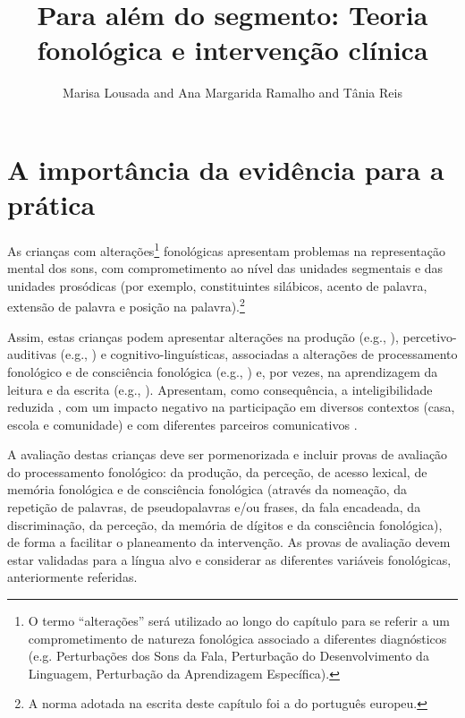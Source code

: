 \documentclass[output=paper,colorlinks,citecolor=brown,booklanguage=portuguese]{langscibook}
\title{Para além do segmento: Teoria fonológica e intervenção clínica}
\author{Marisa Lousada\affiliation{CINTESIS.UA, Escola Superior de Saúde, Universidade de Aveiro} and  Ana Margarida Ramalho\affiliation{Universidade de Lisboa, Faculdade de Letras, Centro de Linguística, Hospital do Espírito Santo - Évora (EPE)} and  Tânia Reis\affiliation{Relicário de Sons}}
\begin{document}
\maketitle

\section{A importância da evidência para a prática}\label{sec:cap7sec1}
As crianças com alterações\footnote{O termo “alterações” será utilizado ao longo do capítulo para se referir a um comprometimento de natureza fonológica associado a diferentes diagnósticos (e.g. Perturbações dos Sons da Fala, Perturbação do Desenvolvimento da Linguagem, Perturbação da Aprendizagem Específica).} fonológicas apresentam problemas na representação mental dos sons, com comprometimento ao nível das unidades segmentais e das unidades prosódicas (por exemplo, constituintes silábicos, acento de palavra, extensão de palavra e posição na palavra).\footnote{A norma adotada na escrita deste capítulo foi a do português europeu.}


Assim, estas crianças podem apresentar alterações na produção (e.g., \citealp{Lousada2013, Ramalho2017a}), percetivo-auditivas (e.g., \citealp{Hearnshaw2018}) e cogniti\-vo-linguísticas, associadas a alterações de processamento fonológico e de consciência fonológica  (e.g., \citealp{Gillon2005, Burgoyne2019, Torgensen1994, Castro2007}) e, por vezes, na aprendizagem da leitura e da escrita (e.g., \citealp{Burgoyne2019}). Apresentam, como consequência, a inteligibilidade reduzida \citep{Lousada2014}, com um impacto negativo na participação em diversos contextos (casa, escola e comunidade) \citep{Ertmer2010} e com diferentes parceiros comunicativos \citep{Lousada2014}. 

A avaliação destas crianças deve ser pormenorizada e incluir provas de avaliação do processamento fonológico: da produção, da perceção, de acesso lexical, de memória fonológica e de consciência fonológica (através da nomeação, da repetição de palavras, de pseudopalavras e/ou frases, da fala encadeada, da discriminação, da perceção, da memória de dígitos e da consciência fonológica), de forma a facilitar o planeamento da intervenção. As provas de avaliação devem estar validadas para a língua alvo e considerar as diferentes variáveis fonológicas, anteriormente referidas.  
\end{document}

